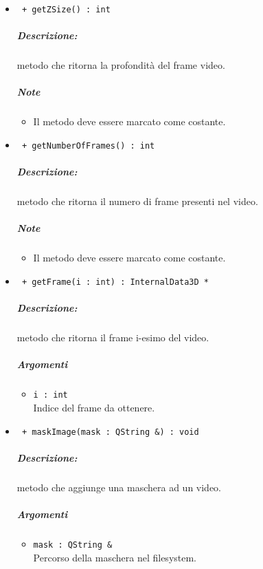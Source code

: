 \begin{itemize}
		\item \color{blue}\verb! + getZSize() : int !\\
		\color{black}
		\subparagraph{Descrizione:} metodo che ritorna la profondità del frame video.
		\subparagraph{Note}
			\begin{itemize}
				\item Il metodo deve essere marcato come costante.
			\end{itemize}
			
		\item \color{blue}\verb! + getNumberOfFrames() : int !\\
		\color{black}
		\subparagraph{Descrizione:} metodo che ritorna il numero di frame presenti nel video.
		\subparagraph{Note}
			\begin{itemize}
				\item Il metodo deve essere marcato come costante.
			\end{itemize}
			
		\item \color{blue}\verb! + getFrame(i : int) : InternalData3D * !\\
		\color{black}
		\subparagraph{Descrizione:} metodo che ritorna il frame i-esimo del video.
		\subparagraph{Argomenti}
				\begin{itemize}
					\item \color{RoyalPurple}\verb!i : int !\\
					\color{black}Indice del frame da ottenere.
				\end{itemize}
		
		\item \color{blue}\verb! + maskImage(mask : QString &) : void !\\
		\color{black}
		\subparagraph{Descrizione:} metodo che aggiunge una maschera ad un video.
		\subparagraph{Argomenti}
				\begin{itemize}
					\item \color{RoyalPurple}\verb!mask : QString & !\\
					\color{black}Percorso della maschera nel filesystem.
				\end{itemize}
				
	\end{itemize}

